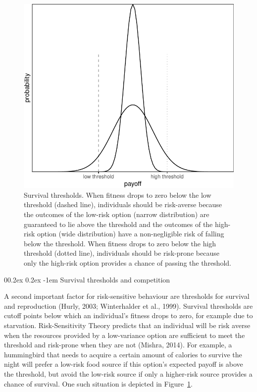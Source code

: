 \documentclass[
  ,man,mask,floatsintext]{apa6}
\makeatletter
\let\oldparagraph\paragraph
\renewcommand{\paragraph}[1]{\oldparagraph{#1}\mbox{}}
\renewcommand{\paragraph}{\@startsection{paragraph}{4}{\parindent}%
  {0\baselineskip \@plus 0.2ex \@minus 0.2ex}%
  {-1em}%
  {\normalfont\normalsize\bfseries\itshape\typesectitle}}
\makeatother
\begin{document}
\begin{figure}

{\centering \includegraphics[width=0.6\linewidth]{rr-risk-sensitivity_files/figure-latex/varianceplot-1} 

}

\caption{Survival thresholds. When fitness drops to zero below the low threshold (dashed line), individuals should be risk-averse because the outcomes of the low-risk option (narrow distribution) are guaranteed to lie above the threshold and the outcomes of the high-risk option (wide distribution) have a non-negligible risk of falling below the threshold. When fitness drops to zero below the high threshold (dotted line), individuals should be risk-prone because only the high-risk option provides a chance of passing the threshold.}\label{fig:varianceplot}
\end{figure}

\hypertarget{survival-thresholds-and-competition}{%
\paragraph{Survival thresholds and competition}\label{survival-thresholds-and-competition}}

A second important factor for risk-sensitive behaviour are thresholds for survival and reproduction (Hurly, 2003; Winterhalder et al., 1999).
Survival thresholds are cutoff points below which an individual's fitness drops to zero, for example due to starvation.
Risk-Sensitivity Theory predicts that an individual will be risk averse when the resources provided by a low-variance option are sufficient to meet the threshold and risk-prone when they are not (Mishra, 2014).
For example, a hummingbird that needs to acquire a certain amount of calories to survive the night will prefer a low-risk food source if this option's expected payoff is above the threshold, but avoid the low-risk source if only a higher-risk source provides a chance of survival.
One such situation is depicted in Figure~\ref{fig:varianceplot}.
\end{document}

